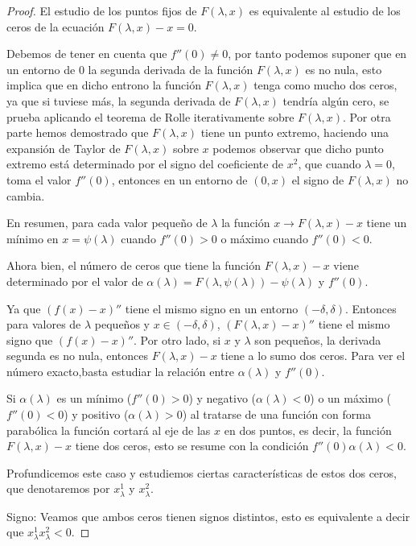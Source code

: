 \documentclass[12pt,a4paper]{report}
\theoremstyle{definition}
\begin{document}
\begin{proof}

El estudio de los puntos fijos de $F(\lambda,x)$ es equivalente al estudio de los ceros de la ecuación $F(\lambda,x) - x = 0$.

Debemos de tener en cuenta que $f''(0) \neq 0$, por tanto podemos suponer que en un entorno de $0$ la segunda derivada de la función $F(\lambda,x)$ es no nula, esto implica que en dicho entrono la función $F(\lambda,x)$ tenga como mucho dos ceros, ya que si tuviese más, la segunda derivada de $F(\lambda,x)$ tendría algún cero, se prueba aplicando el teorema de Rolle iterativamente sobre $F(\lambda,x)$. Por otra parte hemos demostrado que $F(\lambda,x)$ tiene un punto extremo, haciendo una expansión de Taylor de $F(\lambda,x)$ sobre $x$ podemos observar que dicho punto extremo está determinado por el signo del coeficiente de $x^2$, que cuando $\lambda = 0$, toma el valor $f''(0)$, entonces en un entorno de $(0,x)$ el signo de $F(\lambda,x)$ no cambia.  

En resumen, para cada valor pequeño de $\lambda$ la función $x \to F(\lambda,x) - x$ tiene un mínimo en $x = \psi(\lambda)$ cuando $f''(0) > 0$ o máximo cuando $f''(0) < 0$.

Ahora bien, el número de ceros que tiene la función $F(\lambda,x) - x$ viene determinado por el valor de $\alpha(\lambda) = F(\lambda,\psi(\lambda)) - \psi(\lambda)$ y $f''(0)$.

Ya que $(f(x)-x)''$ tiene el mismo signo en un entorno $(-\delta,\delta)$. Entonces para valores de $\lambda$ pequeños y $x \in (-\delta,\delta)$, $(F(\lambda,x) - x)''$ tiene el mismo signo que $(f(x)-x)''$. Por otro lado, si $x$ y $\lambda$ son pequeños, la derivada segunda es no nula, entonces $F(\lambda,x) - x$ tiene a lo sumo dos ceros. Para ver el número exacto,basta estudiar la relación entre $\alpha(\lambda)$ y $f''(0)$.

Si $\alpha(\lambda)$ es un mínimo ($f''(0) > 0$) y negativo ($\alpha(\lambda) < 0$) o un máximo ($f''(0) < 0$) y positivo  ($\alpha(\lambda) > 0$) al tratarse de una función con forma parabólica la función cortará al eje de las $x$ en dos puntos, es decir, la función $F(\lambda,x) - x$ tiene dos ceros, esto se resume con la condición $f''(0)\alpha(\lambda) < 0$. 

Profundicemos este caso y estudiemos ciertas características de estos dos ceros, que denotaremos por $x^1_\lambda$ y $x^2_\lambda$.

Signo: Veamos que ambos ceros tienen signos distintos, esto es equivalente a decir que $x^1_\lambda x^2_\lambda < 0$.


\end{proof}
\end{document}
